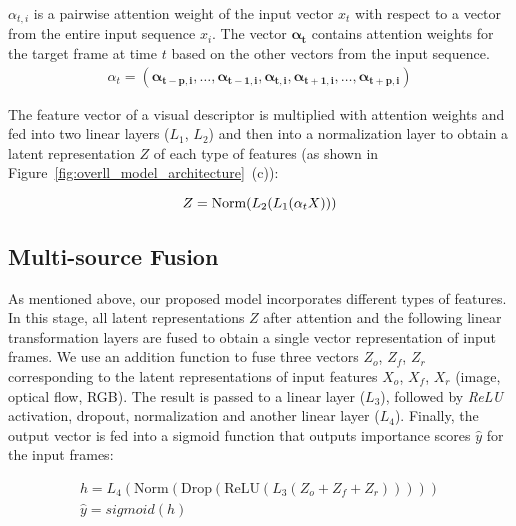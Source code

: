 \documentclass{article}
\begin{document}
$\alpha_{t,i}$ is a pairwise attention weight of the input vector $x_t$ with respect to a vector from the entire input sequence $x_i$. The vector $\mathbf{\alpha_{t}}$ contains attention weights for the target frame at time $t$ based on the other vectors from the input sequence.
\begin{gather}
\alpha_{t}= (\mathbf{\alpha_{t-p,i}},\dots,\mathbf{\alpha_{t-1,i}},\mathbf{\alpha_{t,i}},\mathbf{\alpha_{t+1,i}},\dots,\mathbf{\alpha_{t+p,i}})
\end{gather}

The feature vector of a visual descriptor is multiplied with attention weights and fed into two linear layers ($L_1$, $L_2$) and then into a normalization layer to obtain a latent representation $Z$ of each type of features (as shown in Figure~\ref{fig:overll_model_architecture}~(c)): 

\begin{equation}
Z = \text{Norm}(L_2(L_1(\alpha_tX)))\\
\end{equation}






\subsection{Multi-source Fusion}

As mentioned above, our proposed model incorporates different types of features. In this stage, all latent representations $Z$ after attention and the following linear transformation layers are fused to obtain a single vector representation of input frames. We use an addition function to fuse three vectors $Z_o$, $Z_f$, $Z_r$ corresponding to the latent representations of input features $X_o$, $X_f$, $X_r$ (image, optical flow, RGB). The result is passed to a linear layer ($L_3$), followed by \emph{ReLU} activation, dropout, normalization and another linear layer ($L_4$). Finally, the output vector is fed into a sigmoid function that outputs importance scores $\hat{y}$ for the input frames:

\begin{gather}
\label{eq:fusion}
 h = L_4(\text{Norm}(\text{Drop}(\text{ReLU}(L_3(Z_o + Z_f + Z_r)))))\\
 \hat{y} = sigmoid(h)
\end{gather}
\end{document}

